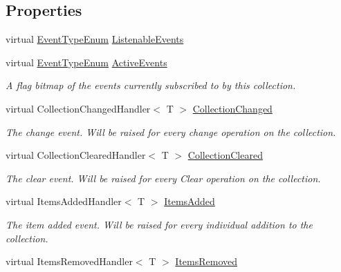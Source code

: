\subsection*{Properties}
\begin{DoxyCompactItemize}
\item 
virtual \hyperlink{namespace_c5_a9143bfd561fffa025d21561674758008}{Event\+Type\+Enum} \hyperlink{class_c5_1_1_collection_value_base_a5e6697e40d1421280e34fe47ebbdcefc}{Listenable\+Events}
\item 
virtual \hyperlink{namespace_c5_a9143bfd561fffa025d21561674758008}{Event\+Type\+Enum} \hyperlink{class_c5_1_1_collection_value_base_a31ad6e1192e929ecd73a5f4e7e9332ba}{Active\+Events}
\begin{DoxyCompactList}\small\item\em A flag bitmap of the events currently subscribed to by this collection. \end{DoxyCompactList}\item 
virtual Collection\+Changed\+Handler$<$ T $>$ \hyperlink{class_c5_1_1_collection_value_base_aba529af0877c1621812c2cc20e6dc7d9}{Collection\+Changed}
\begin{DoxyCompactList}\small\item\em The change event. Will be raised for every change operation on the collection. \end{DoxyCompactList}\item 
virtual Collection\+Cleared\+Handler$<$ T $>$ \hyperlink{class_c5_1_1_collection_value_base_ac3a3ee8103dbad9a0e647ef1a94bcf1f}{Collection\+Cleared}
\begin{DoxyCompactList}\small\item\em The clear event. Will be raised for every Clear operation on the collection. \end{DoxyCompactList}\item 
virtual Items\+Added\+Handler$<$ T $>$ \hyperlink{class_c5_1_1_collection_value_base_a3d7c78ee19bebf048061156c67aca5ef}{Items\+Added}
\begin{DoxyCompactList}\small\item\em The item added event. Will be raised for every individual addition to the collection. \end{DoxyCompactList}\item 
virtual Items\+Removed\+Handler$<$ T $>$ \hyperlink{class_c5_1_1_collection_value_base_a85608b4643299c9d576f68cf7cea70eb}{Items\+Removed}

\end{DoxyCompactItemize}
